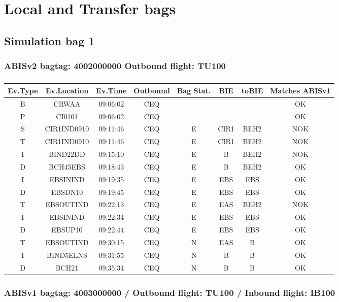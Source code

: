 \documentclass{report}
\begin{document}
\chapter*{Local and Transfer bags}
\section*{Simulation bag 1}
\subsection*{ABISv2 bagtag: 4002000000 Outbound flight: TU100}
\paragraph{}
\begin{longtable}{cccccccc}    \toprule
\rowcolor{white!50}
\textbf{Ev.Type} & \textbf{Ev.Location} & \textbf{Ev.Time} & \textbf{Outbound} & \textbf{Bag Stat.} & \textbf{BIE} & \textbf{toBIE} & \textbf{Matches ABISv1} \\\midrule
B & CRWAA & 09:06:02  & CEQ &  &  &  & OK\\
P & CI0101 & 09:06:02  & CEQ &  &  &  & OK\\
S & CIR1IND0910 & 09:11:46  & CEQ & E & CIR1 & BEH2 & NOK\\
T & CIR1IND0910 & 09:11:46  & CEQ & E & CIR1 & BEH2 & NOK\\
I & BIND22DD & 09:15:10  & CEQ & E & B & BEH2 & NOK\\
D & BCH45EBS & 09:18:43  & CEQ & E & B & BEH2 & OK\\
I & EBSININD & 09:19:35  & CEQ & E & EBS & EBS & OK\\
D & EBSDN10 & 09:19:45  & CEQ & E & EBS & EBS & OK\\
T & EBSOUTIND & 09:22:13  & CEQ & E & EAS & BEH2 & NOK\\
I & EBSININD & 09:22:34  & CEQ & E & EBS & EBS & OK\\
D & EBSUP10 & 09:22:44  & CEQ & E & EBS & EBS & OK\\
T & EBSOUTIND & 09:30:15  & CEQ & N & EAS & B & OK\\
I & BIND5ELNS & 09:31:55  & CEQ & N & B & B & OK\\
D & BCH21 & 09:35:34  & CEQ & N & B & B & OK\\
\bottomrule
\end{longtable}
\subsection*{ABISv1 bagtag: 4003000000 / Outbound flight: TU100 / Inbound flight: IB100}
\end{document}

